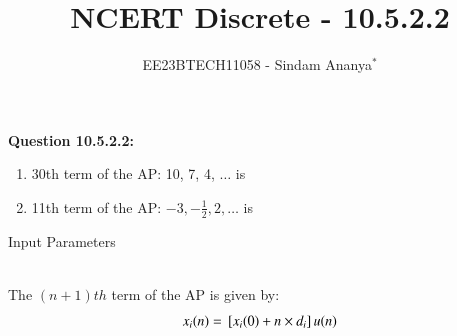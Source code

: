 \documentclass[journal,12pt,twocolumn]{IEEEtran}
\theoremstyle{remark}
\begin{document}

\vspace{3cm}

\title{NCERT Discrete - 10.5.2.2}
\author{EE23BTECH11058 - Sindam Ananya$^{*}$%
}
\maketitle
\newpage
\bigskip

\renewcommand{\thefigure}{\theenumi}
\renewcommand{\thetable}{\theenumi}

\vspace{3cm}
\textbf{Question 10.5.2.2:} 
\begin{enumerate}
\item 30th term of the AP: 10, 7, 4, $\ldots$ is 
\item 11th term of the AP: $-3, -\frac{1}{2}, 2, \ldots$ is
\end{enumerate}
\solution
\begin{table}[h!]
    \centering
    
    \caption{Input Parameters}
    \label{tab:table1}
    \end{table}\\
The $(n+1)th$ term of the AP is given by:
\begin{equation}
    x_i(n) = {}\left[x_i(0) + n \times d_i\right] u(n)
    \label{eq:eq1}
\end{equation}
\end{document}
